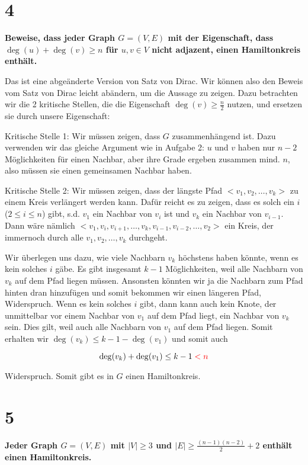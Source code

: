 \documentclass[11pt]{article}
\begin{document}
	\section*{4}
	\textbf{Beweise, dass jeder Graph $G = (V, E)$ mit der Eigenschaft, dass $\deg(u) + \deg(v) \ge n$ für $u, v \in V$ nicht adjazent, einen Hamiltonkreis enthält.}
	
	Das ist eine abgeänderte Version von Satz von Dirac.
	Wir können also den Beweis vom Satz von Dirac leicht abändern, um die Aussage zu zeigen.  
	Dazu betrachten wir die 2 kritische Stellen, die die Eigenschaft $\deg(v) \ge \frac{n}{2}$ nutzen, und ersetzen sie durch unsere Eigenschaft:
	
	Kritische Stelle 1:
	Wir müssen zeigen, dass $G$ zusammenhängend ist. Dazu verwenden wir das gleiche Argument wie in Aufgabe 2:  $u$ und $v$ haben nur $n-2$ Möglichkeiten für einen Nachbar, aber ihre Grade ergeben zusammen mind. $n$, also müssen sie einen gemeinsamen Nachbar haben.
	
	Kritische Stelle 2:
	Wir müssen zeigen, dass der längste Pfad $<v_1, v_2, \dots, v_k>$ zu einem Kreis verlängert werden kann.
	Dafür reicht es zu zeigen, dass es solch ein $i$ ($2 \le i \le n$) gibt, s.d. $v_1$ ein Nachbar von $v_i$ ist und $v_k$ ein Nachbar von $v_{i-1}$. Dann wäre nämlich $<v_1, v_i, v_{i+1}, \dots, v_k, v_{i-1}, v_{i-2}, \dots, v_2>$ ein Kreis, der immernoch durch alle $v_1, v_2, \dots, v_k$ durchgeht.
	
	Wir überlegen uns dazu, wie viele Nachbarn $v_k$ höchstens haben könnte, wenn es kein solches $i$ gäbe.
	Es gibt insgesamt $k-1$ Möglichkeiten, weil alle Nachbarn von $v_k$ auf dem Pfad liegen müssen. 
	Ansonsten könnten wir ja die Nachbarn zum Pfad hinten dran hinzufügen und somit bekommen wir einen längeren Pfad, Widerspruch.
	Wenn es kein solches $i$ gibt, dann kann auch kein Knote, der unmittelbar vor einem Nachbar von $v_1$ auf dem Pfad liegt, ein Nachbar von $v_k$ sein.
	Dies gilt, weil auch alle Nachbarn von $v_1$ auf dem Pfad liegen.
	Somit erhalten wir $\deg(v_k) \le k-1-\deg(v_1)$ und somit auch
	
	\[\deg(v_k)+ \deg(v_1) \le k-1 \color{red}< n\]
	
	Widerspruch. Somit gibt es in $G$ einen Hamiltonkreis.
	
	\section*{5}
	\textbf{Jeder Graph $G=(V,E)$ mit $|V| \ge 3$ und $|E| \ge \frac{(n-1)(n-2)}{2}+2$ enthält einen Hamiltonkreis.}
	
\end{document}

